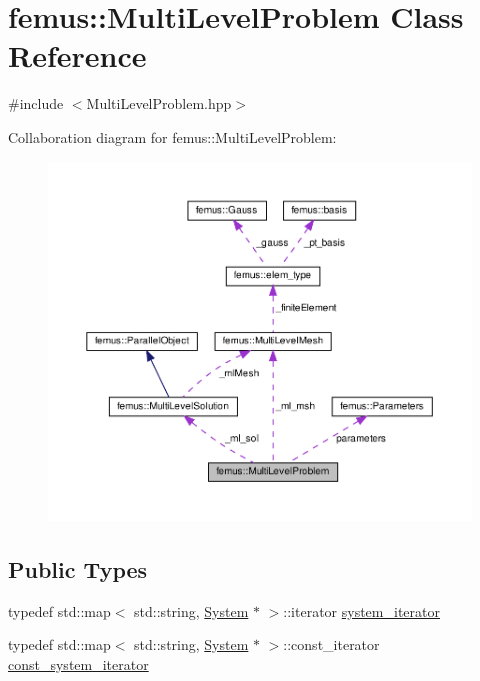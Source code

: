 \hypertarget{classfemus_1_1_multi_level_problem}{}\section{femus\+:\+:Multi\+Level\+Problem Class Reference}
\label{classfemus_1_1_multi_level_problem}


{\ttfamily \#include $<$Multi\+Level\+Problem.\+hpp$>$}



Collaboration diagram for femus\+:\+:Multi\+Level\+Problem\+:
\nopagebreak
\begin{figure}[H]
\begin{center}
\leavevmode
\includegraphics[width=350pt]{classfemus_1_1_multi_level_problem__coll__graph}
\end{center}
\end{figure}
\subsection*{Public Types}
\begin{DoxyCompactItemize}
\item 
typedef std\+::map$<$ std\+::string, \mbox{\hyperlink{classfemus_1_1_system}{System}} $\ast$ $>$\+::iterator \mbox{\hyperlink{classfemus_1_1_multi_level_problem_a0b963c16fa79db05093ceefa48cfe6f2}{system\+\_\+iterator}}
\item 
typedef std\+::map$<$ std\+::string, \mbox{\hyperlink{classfemus_1_1_system}{System}} $\ast$ $>$\+::const\+\_\+iterator \mbox{\hyperlink{classfemus_1_1_multi_level_problem_a8bf081f150a9e5685fc9281fc1dccd16}{const\+\_\+system\+\_\+iterator}}
\end{DoxyCompactItemize}
